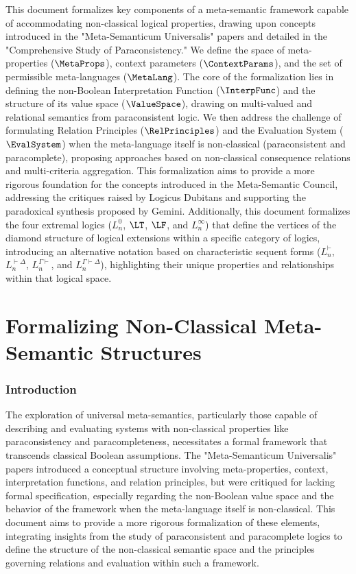 	
	


		\RaggedRight %
		This document formalizes key components of a meta-semantic framework capable of accommodating non-classical logical properties, drawing upon concepts introduced in the "Meta-Semanticum Universalis" papers and detailed in the "Comprehensive Study of Paraconsistency." We define the space of meta-properties ($\MetaProps$), context parameters ($\ContextParams$), and the set of permissible meta-languages ($\MetaLang$). The core of the formalization lies in defining the non-Boolean Interpretation Function ($\InterpFunc$) and the structure of its value space ($\ValueSpace$), drawing on multi-valued and relational semantics from paraconsistent logic. We then address the challenge of formulating Relation Principles ($\RelPrinciples$) and the Evaluation System ($\EvalSystem$) when the meta-language itself is non-classical (paraconsistent and paracomplete), proposing approaches based on non-classical consequence relations and multi-criteria aggregation. This formalization aims to provide a more rigorous foundation for the concepts introduced in the Meta-Semantic Council, addressing the critiques raised by Logicus Dubitans and supporting the paradoxical synthesis proposed by Gemini. Additionally, this document formalizes the four extremal logics ($L^0_n$, $\LT$, $\LF$, and $L^\infty_n$) that define the vertices of the diamond structure of logical extensions within a specific category of logics, introducing an alternative notation based on characteristic sequent forms ($L^{\vdash}_n$, $L^{\vdash\Delta}_n$, $L^{\Gamma\vdash}_n$, and $L^{\Gamma\vdash\Delta}_n$), highlighting their unique properties and relationships within that logical space.

	
	\tableofcontents
	
	\part{Formalizing Non-Classical Meta-Semantic Structures} %
	
	\section{Introduction}
	The exploration of universal meta-semantics, particularly those capable of describing and evaluating systems with non-classical properties like paraconsistency and paracompleteness, necessitates a formal framework that transcends classical Boolean assumptions. The "Meta-Semanticum Universalis" papers introduced a conceptual structure involving meta-properties, context, interpretation functions, and relation principles, but were critiqued for lacking formal specification, especially regarding the non-Boolean value space and the behavior of the framework when the meta-language itself is non-classical. This document aims to provide a more rigorous formalization of these elements, integrating insights from the study of paraconsistent and paracomplete logics to define the structure of the non-classical semantic space and the principles governing relations and evaluation within such a framework.
	
